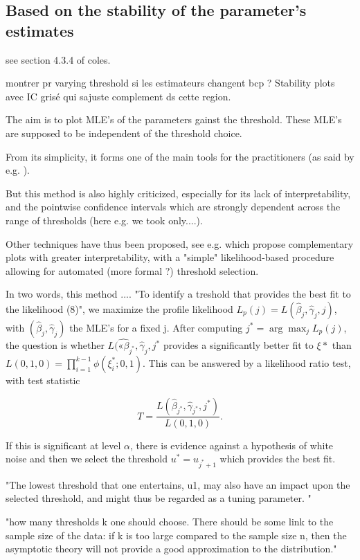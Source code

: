 \documentclass[11pt,a4paper,openany ]{book}
\newcommand{\argmaxD}{\arg\!\max} %
\begin{document}
\subsection*{Based on the stability of the parameter's estimates}
see section 4.3.4 of coles.

montrer pr varying threshold si les estimateurs changent bcp ?  Stability plots avec IC grisé qui sajuste complement ds cette region.

The aim is to plot MLE's of the parameters gainst the threshold. These MLE's are supposed to be independent of the threshold choice. 

From its simplicity, it forms one of the main tools for the practitioners (as said by e.g. \citet{} ).

But this method is also highly criticized, especially for its lack of interpretability, and the pointwise confidence intervals which are strongly dependent across the range of thresholds (here e.g. we took only....).

Other techniques have thus been proposed, see e.g. \citet{Wadsworth_exploiting_2016} which propose complementary plots with greater interpretability, with a "simple" likelihood-based procedure allowing for automated (more formal ?) threshold selection.

In two words, this method ....
"To identify a treshold that provides the best fit to the likelihood (8)", we maximize the profile likelihood $L_p(j)=L(\hat{\beta}_j,\hat{\gamma}_j,j)$, with $(\hat{\beta}_j,\hat{\gamma}_j)$ the MLE's for a fixed j. After computing $j^*=\argmaxD_j L_p(j)$, the question is whether $L(\hat{«\beta}_{j^*},\hat{\gamma}_j,j^*$ provides a significantly better fit to $\xi*$ than $L(0,1,0)=\prod_{i=1}^{k-1}\phi(\xi_i^*;0,1)$. This can be answered by a likelihood ratio test, with test statistic 

\begin{equation}
T=\frac{L(\hat{\beta}_{j^*},\hat{\gamma}_{j^*},j^*)}{L(0,1,0)}.
\end{equation}

If this is significant at level $\alpha$, there is evidence against a hypothesis of white noise and then we select the threshold $u^*=u_{j^*+1}$ which provides the best fit.

"The lowest threshold that one entertains, u1, may also
have an impact upon the selected threshold, and might thus be
regarded as a tuning parameter. "

"how many thresholds k one
should choose. There should be some link to the sample size of
the data: if k is too large compared to the sample size n, then the
asymptotic theory will not provide a good approximation to the
distribution."
\end{document}
